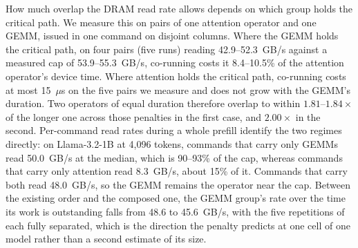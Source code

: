 How much overlap the DRAM read rate allows depends on which group holds the critical path.
We measure this on pairs of one attention operator and one GEMM, issued in one command on disjoint columns.
Where the GEMM holds the critical path, on four pairs (five runs) reading 42.9--52.3~GB/s against a measured cap of 53.9--55.3~GB/s, co-running costs it 8.4--10.5\% of the attention operator's device time.
Where attention holds the critical path, co-running costs at most 15~$\mu$s on the five pairs we measure and does not grow with the GEMM's duration.
Two operators of equal duration therefore overlap to within $1.81$--$1.84\times$ of the longer one across those penalties in the first case, and $2.00\times$ in the second.
Per-command read rates during a whole prefill identify the two regimes directly: on Llama-3.2-1B at 4{,}096 tokens, commands that carry only GEMMs read 50.0~GB/s at the median, which is 90--93\% of the cap, whereas commands that carry only attention read 8.3~GB/s, about 15\% of it.
Commands that carry both read 48.0~GB/s, so the GEMM remains the operator near the cap.
Between the existing order and the composed one, the GEMM group's rate over the time its work is outstanding falls from 48.6 to 45.6~GB/s, with the five repetitions of each fully separated, which is the direction the penalty predicts at one cell of one model rather than a second estimate of its size.

